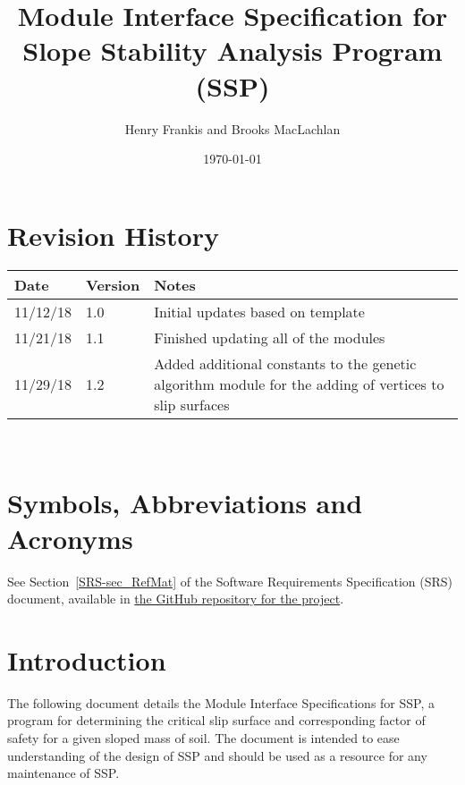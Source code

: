 \documentclass[12pt, titlepage]{article}
\newcommand{\progname}{SSP}
\begin{document}
\title{Module Interface Specification for Slope Stability Analysis Program 
(\progname)} 
\author{Henry Frankis and Brooks MacLachlan}
\date{\today}
	
\maketitle


\section{Revision History}

\begin{tabularx}{\textwidth}{p{3cm}p{2cm}X}
	\toprule {\bf Date} & {\bf Version} & {\bf Notes}\\
	\midrule
	11/12/18 & 1.0 & Initial updates based on template\\
	11/21/18 & 1.1 & Finished updating all of the modules\\
	11/29/18 & 1.2 & Added additional constants to the genetic algorithm module 
	for the adding of vertices to slip surfaces\\
	\bottomrule
\end{tabularx}

~\newpage

\section{Symbols, Abbreviations and Acronyms}

See Section~\ref{SRS-sec_RefMat} of the Software Requirements Specification 
(SRS) document, available in
\href{https://github.com/smiths/caseStudies/blob/master/CaseStudies/ssp/docs/SRS/SRS.pdf}
{the GitHub repository for the project}.

\newpage

\tableofcontents

\newpage


\section{Introduction}

The following document details the Module Interface Specifications for
\progname, a program for determining the critical slip surface and 
corresponding factor of safety for a given sloped mass of soil. The document is 
intended to ease understanding of the design of \progname{} and should be used 
as a resource for any maintenance of \progname{}.
\end{document}
